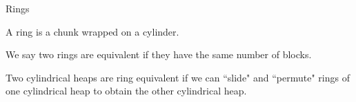 \documentclass[9pt,handout]{beamer}
\newcommand{\Z}{\mathbb{Z}}
\newcommand\xxaxis{0}
\newcommand\yyaxis{90}
\newcommand\sq[2]{
    \fill[fill=gray!25, draw=black, rounded corners, line width=1pt, shift={(\xxaxis:#1)}, shift={(\yyaxis:#2)}] 
    (0,0) -- (1,0) -- (1,-1) -- (0,-1) -- cycle; }
\begin{document}
\begin{frame}{Rings}
\begin{definition} A \alert{ring} is a chunk wrapped on a cylinder.
\begin{center}  \end{center}
\end{definition}

\begin{definition} We say two rings are \alert{equivalent} if they have the same number of blocks. %
\end{definition}

\begin{definition} Two cylindrical heaps are \alert{ring equivalent} if we can ``slide" and ``permute" rings of one cylindrical heap to obtain the other cylindrical heap.
\end{definition}
\end{frame}
\end{document}

